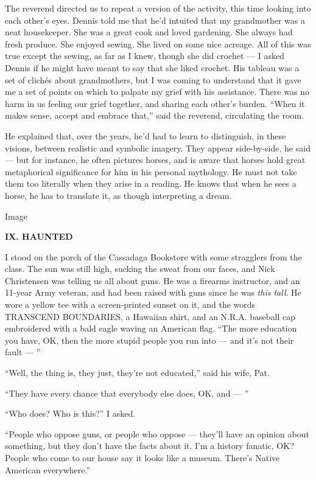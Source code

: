 The reverend directed us to repeat a version of the activity, this time
looking into each other's eyes. Dennis told me that he'd intuited that
my grandmother was a neat housekeeper. She was a great cook and loved
gardening. She always had fresh produce. She enjoyed sewing. She lived
on some nice acreage. All of this was true except the sewing, as far as
I knew, though she did crochet --- I asked Dennis if he might have meant
to say that she liked crochet. His tableau was a set of clichés about
grandmothers, but I was coming to understand that it gave me a set of
points on which to palpate my grief with his assistance. There was no
harm in us feeling our grief together, and sharing each other's burden.
``When it makes sense, accept and embrace that,'' said the reverend,
circulating the room.

He explained that, over the years, he'd had to learn to distinguish, in
these visions, between realistic and symbolic imagery. They appear
side-by-side, he said --- but for instance, he often pictures horses,
and is aware that horses hold great metaphorical significance for him in
his personal mythology. He must not take them too literally when they
arise in a reading. He knows that when he sees a horse, he has to
translate it, as though interpreting a dream.

Image

\textbf{IX. HAUNTED}

I stood on the porch of the Cassadaga Bookstore with some stragglers
from the class. The sun was still high, sucking the sweat from our
faces, and Nick Christensen was telling us all about guns. He was a
firearms instructor, and an 11-year Army veteran, and had been raised
with guns since he was \emph{this tall}. He wore a yellow tee with a
screen-printed sunset on it, and the words TRANSCEND BOUNDARIES, a
Hawaiian shirt, and an N.R.A. baseball cap embroidered with a bald eagle
waving an American flag. ``The more education you have, OK, then the
more stupid people you run into --- and it's not their fault --- ''

``Well, the thing is, they just, they're not educated,'' said his wife,
Pat.

``They have every chance that everybody else does, OK, and --- ''

``Who does? Who is this?'' I asked.

``People who oppose guns, or people who oppose --- they'll have an
opinion about something, but they don't have the facts about it. I'm a
history fanatic, OK? People who come to our house say it looks like a
museum. There's Native American everywhere.''

